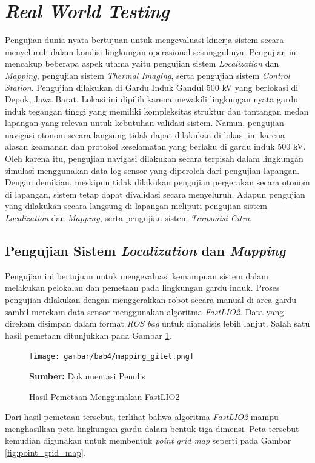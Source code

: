 \section{\emph{Real World Testing}}
Pengujian dunia nyata bertujuan untuk mengevaluasi kinerja sistem secara menyeluruh dalam kondisi lingkungan operasional sesungguhnya. Pengujian ini mencakup beberapa aspek utama yaitu pengujian sistem \emph{Localization} dan \emph{Mapping}, pengujian sistem \emph{Thermal Imaging}, serta pengujian sistem \emph{Control Station}. Pengujian dilakukan di Gardu Induk Gandul 500 kV yang berlokasi di Depok, Jawa Barat. Lokasi ini dipilih karena mewakili lingkungan nyata gardu induk tegangan tinggi yang memiliki kompleksitas struktur dan tantangan medan lapangan yang relevan untuk kebutuhan validasi sistem. Namun, pengujian navigasi otonom secara langsung tidak dapat dilakukan di lokasi ini karena alasan keamanan dan protokol keselamatan yang berlaku di gardu induk 500 kV. Oleh karena itu, pengujian navigasi dilakukan secara terpisah dalam lingkungan simulasi menggunakan data log sensor yang diperoleh dari pengujian lapangan.  Dengan demikian, meskipun tidak dilakukan pengujian pergerakan secara otonom di lapangan, sistem tetap dapat divalidasi secara menyeluruh. Adapun pengujian yang dilakukan secara langsung di lapangan meliputi pengujian sistem \emph{Localization} dan \emph{Mapping}, serta pengujian sistem \emph{Transmisi Citra}.



\subsection{Pengujian Sistem \emph{Localization} dan \emph{Mapping}}
Pengujian ini bertujuan untuk mengevaluasi kemampuan sistem dalam melakukan pelokalan dan pemetaan pada lingkungan gardu induk. Proses pengujian dilakukan dengan menggerakkan robot secara manual di area gardu sambil merekam data sensor menggunakan algoritma \emph{FastLIO2}. Data yang direkam disimpan dalam format \emph{ROS bag} untuk dianalisis lebih lanjut. Salah satu hasil pemetaan ditunjukkan pada Gambar \ref{fig:fastlio2_mapping}.

\begin{figure}[H]
\centering
\texttt{[image: gambar/bab4/mapping\_gitet.png]}
\caption{Hasil Pemetaan Menggunakan FastLIO2}
\label{fig:fastlio2_mapping}
\footnotesize{\textbf{Sumber:} Dokumentasi Penulis}
\end{figure}

Dari hasil pemetaan tersebut, terlihat bahwa algoritma \emph{FastLIO2} mampu menghasilkan peta lingkungan gardu dalam bentuk tiga dimensi. Peta tersebut kemudian digunakan untuk membentuk \emph{point grid map} seperti pada Gambar \ref{fig:point_grid_map}.

